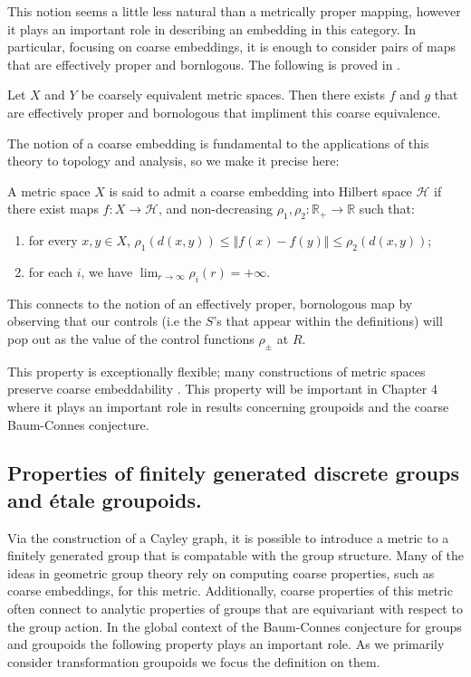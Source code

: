 This notion seems a little less natural than a metrically proper mapping, however it plays an important role in describing an embedding in this category. In particular, focusing on coarse embeddings, it is enough to consider pairs of maps that are effectively proper and bornlogous. The following is proved in \cite{EG-permanence}.

\begin{lemma}
Let $X$ and $Y$ be coarsely equivalent metric spaces. Then there exists $f$ and $g$ that are effectively proper and bornologous that impliment this coarse equivalence.
\end{lemma}

The notion of a coarse embedding is fundamental to the applications of this theory to topology and analysis, so we make it precise here:

\begin{definition}\label{def:FCE}
A metric space $X$ is said to admit a coarse embedding into Hilbert space $\mathcal{H}$ if there exist maps $f:X \rightarrow \mathcal{H}$,  and non-decreasing $\rho_{1},\rho_{2}:\mathbb{R}_{+} \rightarrow \mathbb{R}$ such that:
\begin{enumerate}
\item for every $x,y \in X$, $\rho_{1}(d(x,y)) \leq \Vert f(x) - f(y) \Vert \leq \rho_{2}(d(x,y))$;
\item for each $i$, we have $\lim_{r \rightarrow \infty}\rho_{i}(r) = +\infty$.
\end{enumerate}
\end{definition}

This connects to the notion of an effectively proper, bornologous map by observing that our controls (i.e the $S$'s that appear within the definitions) will pop out as the value of the control functions $\rho_{\pm}$ at $R$.

This property is exceptionally flexible; many constructions of metric spaces preserve coarse embeddability \cite{EG-permanence}. This property will be important in Chapter 4 where it plays an important role in results concerning groupoids and the coarse Baum-Connes conjecture.

\subsection{Properties of finitely generated discrete groups and \'etale groupoids.}
Via the construction of a Cayley graph, it is possible to introduce a metric to a finitely generated group that is compatable with the group structure. Many of the ideas in geometric group theory rely on computing coarse properties, such as coarse embeddings, for this metric. Additionally, coarse properties of this metric often connect to analytic properties of groups that are equivariant with respect to the group action. In the global context of the Baum-Connes conjecture for groups and groupoids the following property plays an important role. As we primarily consider transformation groupoids we focus the definition on them.

